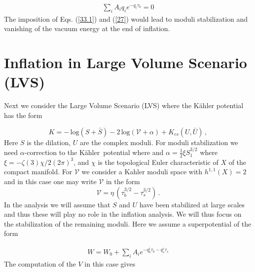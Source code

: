 \documentclass[12pt]{article}
\def\K{K\"ahler~}
\begin{document}
\begin{align}
  \sum_i A_i q_i e^{-q_i \tau_0}=0
  \label{27}
\end{align}
The imposition of Eqs. (\ref{33.1}) and (\ref{27}) would lead to moduli stabilization and
vanishing of the vacuum energy at the end of  inflation. \\


\section{Inflation in Large Volume Scenario (LVS) \label{sec6}}

Next we consider the Large Volume Scenario (LVS) \cite{Balasubramanian:2005zx}
where  the K\"ahler potential has the form

\begin{equation}
  K =  - \, \text{log} (S+ \bar{S}) -2 \, \text{log} (\mathcal{V}  +\alpha)
  + K_{cs} (U, \bar{U})  \, ,
\end{equation}
Here $S$ is the dilation, $U$ are the complex moduli.  For moduli stabilization  we need  $\alpha$-correction to the \K potential where
and  $\alpha = \frac{1}{2} \xi S_1^{3/2}$ where  $\xi = -\zeta (3) \chi/2 (2\pi)^3$, and $\chi$ is the topological Euler characteristic  of $X$ of the compact manifold. For $\mathcal{V}$ we consider  a Kahler moduli space
with $h^{1,1}(X)=2$ and in this case one may write  $\mathcal{V}$ in the form
\begin{equation}
  \mathcal{V}  = \eta \,( \tau_b^{3/2} - \tau_s^{3/2}) \, .
\end{equation}
In the analysis we will  assume that  $S$ and $U$ have been stabilized at large scales and thus these will play no role in the
inflation analysis.  We will thus focus on the stabilization of the remaining moduli.  Here we assume a superpotential of the form

\begin{align}
  W= W_0 +\sum_i A_i e^{-q^i_b \tau_b -q^i_s \tau_s}
\end{align}
The computation of the $V$ in this case gives
\end{document}
